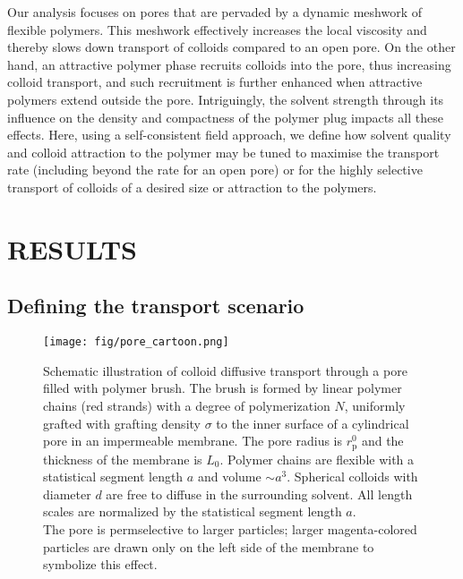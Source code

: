 \documentclass[12pt, a4paper]{article}
\begin{document}

Our analysis focuses on pores that are pervaded by a dynamic meshwork of flexible polymers. 
This meshwork effectively increases the local viscosity and thereby slows down transport of colloids compared to an open pore. 
On the other hand, an attractive polymer phase recruits colloids into the pore, thus increasing colloid transport, 
and such recruitment is further enhanced when attractive polymers extend outside the pore. 
Intriguingly, the solvent strength through its influence on the density and compactness of the polymer plug impacts all these effects. 
Here, using a self-consistent field approach, we define how solvent quality and colloid attraction to the polymer may be tuned 
to maximise the transport rate (including beyond the rate for an open pore) or for the highly selective transport of colloids of a desired size or attraction to the polymers.


\section{RESULTS}


\subsection{Defining the transport scenario}

\begin{figure}
    \centering
    \texttt{[image: fig/pore\_cartoon.png]}
    \caption{
        Schematic illustration of colloid diffusive transport through a pore filled with polymer brush. 
        The brush is formed by linear polymer chains (red strands) with a degree of polymerization $N$, uniformly grafted with grafting density $\sigma$ 
        to the inner surface of a cylindrical pore in an impermeable membrane. The pore radius is $r_{\text{p}}^{0}$ and the thickness of the membrane is $L_{0}$.
        Polymer chains are flexible with a statistical segment length $a$ and volume $\sim a^3$. 
        Spherical colloids with diameter $d$ are free to diffuse in the surrounding solvent.
        All length scales are normalized by the statistical segment length $a$.
        \\
        The pore is permselective to larger particles; larger magenta-colored particles are drawn only on the left side of the membrane to symbolize this effect.
        }
    \label{fig:colloid_transport}
\end{figure}
\end{document}
